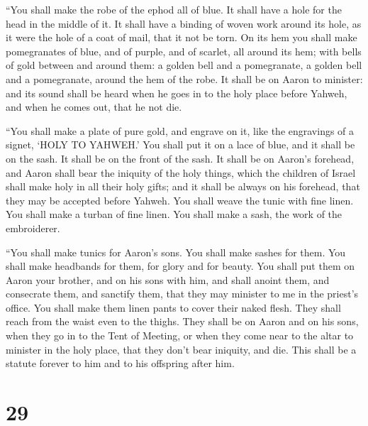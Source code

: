  ``You shall make the robe of the ephod all of blue.
 It shall have a hole for the head in the middle of it. It
shall have a binding of woven work around its hole, as it were the hole
of a coat of mail, that it not be torn.  On its hem you
shall make pomegranates of blue, and of purple, and of scarlet, all
around its hem; with bells of gold between and around them:
 a golden bell and a pomegranate, a golden bell and a
pomegranate, around the hem of the robe.  It shall be on
Aaron to minister: and its sound shall be heard when he goes in to the
holy place before Yahweh, and when he comes out, that he not die.

 ``You shall make a plate of pure gold, and engrave on it,
like the engravings of a signet, `HOLY TO YAHWEH.'  You
shall put it on a lace of blue, and it shall be on the sash. It shall be
on the front of the sash.  It shall be on Aaron's forehead,
and Aaron shall bear the iniquity of the holy things, which the children
of Israel shall make holy in all their holy gifts; and it shall be
always on his forehead, that they may be accepted before Yahweh.
 You shall weave the tunic with fine linen. You shall make
a turban of fine linen. You shall make a sash, the work of the
embroiderer.

 ``You shall make tunics for Aaron's sons. You shall make
sashes for them. You shall make headbands for them, for glory and for
beauty.  You shall put them on Aaron your brother, and on
his sons with him, and shall anoint them, and consecrate them, and
sanctify them, that they may minister to me in the priest's office.
 You shall make them linen pants to cover their naked
flesh. They shall reach from the waist even to the thighs. 
They shall be on Aaron and on his sons, when they go in to the Tent of
Meeting, or when they come near to the altar to minister in the holy
place, that they don't bear iniquity, and die. This shall be a statute
forever to him and to his offspring after him.

\hypertarget{section-28}{%
\section{29}\label{section-28}}


